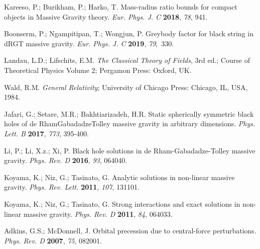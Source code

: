\documentclass[aps,amsmath,amssymb,twocolumn]{revtex4}
\begin{document}
\begin{thebibliography}{999}
 Kareeso, P.; Burikham, P.; Harko, T. 
  Mass-radius ratio bounds for compact objects in Massive Gravity theory. 
\emph{ Eur. Phys. J. C} \textbf{2018}, \emph{78}, 941. 


Boonserm, P.; Ngampitipan, T.; Wongjun, P. 
Greybody factor for black string in dRGT massive gravity.
\emph{Eur. Phys. J. C} \textbf{2019},  \emph{79},~330.

   
 Landau, L.D.; Lifschits, E.M. \textit{The Classical Theory of Fields}, 3rd ed.; Course of Theoretical Physics Volume 2; Pergamon Press: Oxford, UK. 


Wald, R.M.   \textit{General Relativity}; University of Chicago Press: Chicago, IL, USA, 1984.

 Jafari, G.; Setare, M.R.; Bakhtiarizadeh, H.R.  
Static spherically symmetric black holes of de Rham\textendash{}Gabadadze\textendash{}Tolley massive gravity in arbitrary dimensions.
\emph{Phys. Lett. B}  \textbf{2017}, \emph{773}, 395-400.

 Li, P.; Li, X.z.; Xi, P. 
Black hole solutions in de Rham-Gabadadze-Tolley massive gravity.
\emph{Phys. Rev. D} \textbf{2016}, \emph{93},  064040.

 Koyama, K.; Niz, G.; Tasinato, G. 
Analytic solutions in non-linear massive gravity.
\emph{Phys. Rev. Lett.} \textbf{2011}, \emph{107}, 131101.

 Koyama, K.; Niz, G.; Tasinato, G. 
Strong interactions and exact solutions in non-linear massive gravity.
\emph{Phys. Rev. D} \textbf{2011}, \emph{84}, 064033.


 Adkins, G.S.; McDonnell, J. 
Orbital precession due to central-force perturbations.
\emph{Phys. Rev. D} \textbf{2007}, \emph{75}, 082001.


\end{thebibliography}
\end{document}
